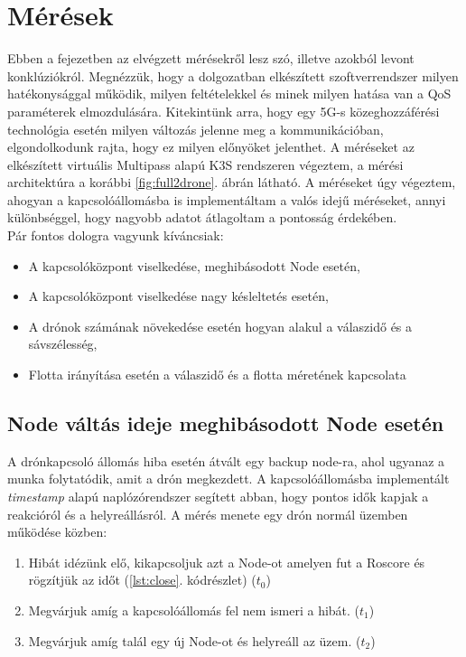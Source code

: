 \chapter{Mérések}

Ebben a fejezetben az elvégzett mérésekről lesz szó, illetve azokból levont konklúziókról. Megnézzük, hogy a dolgozatban elkészített szoftverrendszer milyen hatékonysággal működik, milyen feltételekkel és minek milyen hatása van a QoS paraméterek elmozdulására. Kitekintünk arra, hogy egy 5G-s közeghozzáférési technológia esetén milyen változás jelenne meg a kommunikációban, elgondolkodunk rajta, hogy ez milyen előnyöket jelenthet. A méréseket az elkészített virtuális Multipass alapú K3S rendszeren végeztem, a mérési architektúra a korábbi \ref{fig:full2drone}. ábrán látható. A méréseket úgy végeztem, ahogyan a kapcsolóállomásba is implementáltam a valós idejű méréseket, annyi különbséggel, hogy nagyobb adatot átlagoltam a pontosság érdekében. \\

\noindent
Pár fontos dologra vagyunk kíváncsiak:
\begin{itemize}
	\item A kapcsolóközpont viselkedése, meghibásodott Node esetén,
	\item A kapcsolóközpont viselkedése nagy késleltetés esetén,
	\item A drónok számának növekedése esetén hogyan alakul a válaszidő és a sávszélesség,
	\item Flotta irányítása esetén a válaszidő és a flotta méretének kapcsolata
\end{itemize}

\section{Node váltás ideje meghibásodott Node esetén}
A drónkapcsoló állomás hiba esetén átvált egy backup node-ra, ahol ugyanaz a munka folytatódik, amit a drón megkezdett. A kapcsolóállomásba implementált \emph{timestamp} alapú naplózórendszer segített abban, hogy pontos idők kapjak a reakcióról és a helyreállásról. A mérés menete egy drón normál üzemben működése közben:
\begin{enumerate}
	\item Hibát idézünk elő, kikapcsoljuk azt a Node-ot amelyen fut a Roscore és rögzítjük az időt (\ref{lst:close}. kódrészlet) ($t_0$)
	\item Megvárjuk amíg a kapcsolóállomás fel nem ismeri a hibát. ($t_1$)
	\item Megvárjuk amíg talál egy új Node-ot és helyreáll az üzem. ($t_2$)
\end{enumerate}

